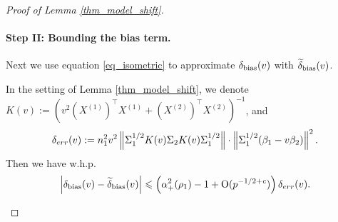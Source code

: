 \begin{proof}[Proof of Lemma \ref{thm_model_shift}]
\paragraph{Step II: Bounding the bias term.}
Next we use equation \eqref{eq_isometric} to approximate $\delta_{\text{bias}}(v)$ with $\widetilde\delta_{\text{bias}}(v)$. %
\begin{claim}\label{prop_model_shift}
	In the setting of Lemma \ref{thm_model_shift},
	we denote $K(v) := (v^2(X^{(1)})^{\top}X^{(1)} + (X^{(2)})^{\top}X^{(2)})^{-1}$, and
	\begin{align*}
		\delta_{err}(v) := n_1^2 v^2 \left\| \Sigma_1^{1/2} K(v) \Sigma_2 K(v) \Sigma_1^{1/2} \right\| \cdot \left\| \Sigma_1^{1/2} (\beta_1 - v\beta_2) \right\|^2.
	\end{align*}
	Then we have w.h.p.
	\begin{align*}
		 \left| \delta_{\text{bias}}(v)-\widetilde\delta_{\text{bias}}(v)\right|
		\leqslant  \left( \alpha_+^2(\rho_1)-1 + \operatorname{O}(p^{-1/2+{\mathit{c}}})\right)\delta_{err}(v).
	\end{align*}
\end{claim}


\end{proof}
